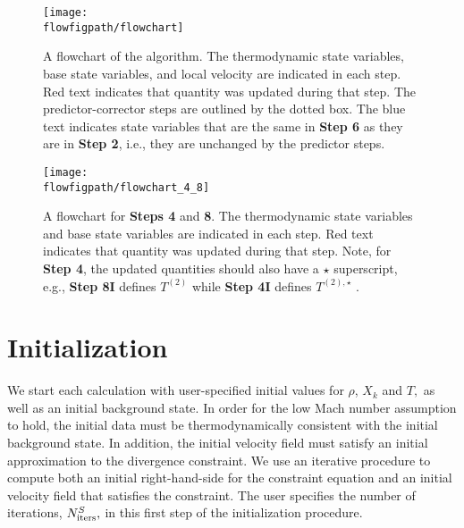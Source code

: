\begin{figure}[tb]
\centering
\texttt{[image: \\flowfigpath/flowchart]}
\caption[Graphical flowchart of MAESTRO]
  {\label{Fig:flowchart} A flowchart of the algorithm.  The
  thermodynamic state variables, base state variables, and local velocity are
  indicated in each step.  Red text indicates that quantity was
  updated during that step.  The predictor-corrector steps are
  outlined by the dotted box.  The blue text indicates state
  variables that are the same in {\bf Step 6} as they are in
  {\bf Step 2}, i.e., they are unchanged by the predictor steps.}
\end{figure}
\begin{figure}[tb]                                               
\centering
\texttt{[image: \\flowfigpath/flowchart\_4\_8]}
\caption[Graphical flowchart of the density and enthalpy update steps]
{\label{Fig:flowchart48} A flowchart for {\bf Steps 4} and {\bf 8}.
  The thermodynamic state variables and base state variables are
  indicated in each step.  Red text indicates that quantity was
  updated during that step.  Note, for {\bf Step 4}, the updated
  quantities should also have a $\star$ superscript, e.g., {\bf Step
    8I} defines $T^{(2)}$ while {\bf Step 4I} defines $T^{(2),\star}$
  .}
\end{figure}



\section{Initialization}\label{Sec:Initialization}

We start each calculation with user-specified initial values for
$\rho$, $X_k$ and $T,$ as well as an initial background state.  In
order for the low Mach number assumption to hold, the initial data
must be thermodynamically consistent with the initial background
state.  In addition, the initial velocity field must satisfy an
initial approximation to the divergence constraint.  We use an iterative
procedure to compute both an initial right-hand-side for the
constraint equation and an initial velocity field that satisfies
the constraint.  The user specifies the number of iterations,
$N_{\rm iters}^{S},$ in this first step of the initialization procedure.

